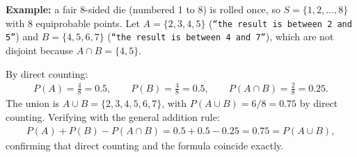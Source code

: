 \begin{solproblema}[prob:b993271]
	\textbf{Example:} a fair 8-sided die (numbered 1 to 8) is rolled once, so $S=\{1,2,\dots,8\}$ with $8$ equiprobable points. Let $A=\{2,3,4,5\}$ (\texttt{``the result is between 2 and 5''}) and $B=\{4,5,6,7\}$ (\texttt{``the result is between 4 and 7''}), which are not disjoint because $A\cap B=\{4,5\}$.

	By direct counting:
	\begin{align}
		P(A) = \frac{4}{8}=0.5, \qquad P(B) = \frac{4}{8}=0.5, \qquad P(A\cap B) = \frac{2}{8}=0.25.
	\end{align}
	The union is $A\cup B=\{2,3,4,5,6,7\}$, with $P(A\cup B)=6/8=0.75$ by direct counting. Verifying with the general addition rule:
	\begin{align}
		P(A) + P(B) - P(A\cap B) = 0.5+0.5-0.25 = 0.75 = P(A\cup B),
	\end{align}
	confirming that direct counting and the formula coincide exactly.
\end{solproblema}
